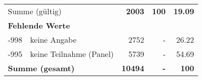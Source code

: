 \begin{longtable}{lXrrr}
     \midrule
     \multicolumn{2}{l}{Summe (gültig)} &
       \textbf{\num{2003}} &
     \textbf{\num{100}} &
       \textbf{\num[round-mode=places,round-precision=2]{19.09}} \\
     \multicolumn{5}{l}{\textbf{Fehlende Werte}}\\
       -998 &
       keine Angabe &
         \num{2752} &
        - &
         \num[round-mode=places,round-precision=2]{26.22} \\
       -995 &
       keine Teilnahme (Panel) &
         \num{5739} &
        - &
         \num[round-mode=places,round-precision=2]{54.69} \\
     \midrule
     \multicolumn{2}{l}{\textbf{Summe (gesamt)}} &
          \textbf{\num{10494}} &
        \textbf{-} &
        \textbf{\num{100}} \\
     \bottomrule
     \end{longtable}
     
